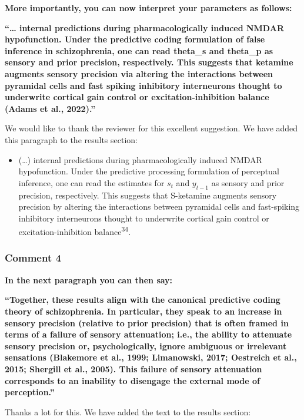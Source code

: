 \documentclass[
]{article}
\providecommand{\tightlist}{%
  \setlength{\itemsep}{0pt}\setlength{\parskip}{0pt}}
\begin{document}
\textbf{More importantly, you can now interpret your parameters as
follows:}

\textbf{``\ldots{} internal predictions during pharmacologically induced
NMDAR hypofunction. Under the predictive coding formulation of false
inference in schizophrenia, one can read theta\_s and theta\_p as
sensory and prior precision, respectively. This suggests that ketamine
augments sensory precision via altering the interactions between
pyramidal cells and fast spiking inhibitory interneurons thought to
underwrite cortical gain control or excitation-inhibition balance (Adams
et al., 2022).''}

We would like to thank the reviewer for this excellent suggestion. We
have added this paragraph to the results section:

\begin{itemize}
\tightlist
\item
  (\ldots) internal predictions during pharmacologically induced NMDAR
  hypofunction. Under the predictive processing formulation of
  perceptual inference, one can read the estimates for \(s_t\) and
  \(y_{t-1}\) as sensory and prior precision, respectively. This
  suggests that S-ketamine augments sensory precision by altering the
  interactions between pyramidal cells and fast-spiking inhibitory
  interneurons thought to underwrite cortical gain control or
  excitation-inhibition balance\textsuperscript{34}.
\end{itemize}

\subsubsection{Comment 4}\label{comment-4}

\textbf{In the next paragraph you can then say:}

\textbf{``Together, these results align with the canonical predictive
coding theory of schizophrenia. In particular, they speak to an increase
in sensory precision (relative to prior precision) that is often framed
in terms of a failure of sensory attenuation; i.e., the ability to
attenuate sensory precision or, psychologically, ignore ambiguous or
irrelevant sensations (Blakemore et al., 1999; Limanowski, 2017;
Oestreich et al., 2015; Shergill et al., 2005). This failure of sensory
attenuation corresponds to an inability to disengage the external mode
of perception.''}

Thanks a lot for this. We have added the text to the results section:
\end{document}

